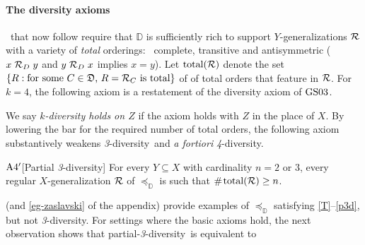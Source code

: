 \documentclass[12pt,a4paper,twoside]{article}
\newcommand{\gsii}{$\textup{GS03}$}
\newcommand{\reg}{\operatorname{reg}}
\newcommand{\preceqb}{\mathbin{\preceq}}
\newcommand{\countof}{\mathbin{\#}\hskip1pt}
\newcommand{\ext}{\mathrel{\mc R}}
\newcommand{\extb}{\mathbin{\mc R}}
\newcommand{\total}{\textup{total}}
\newcommand{\mbbd}{{\mathds D}}
\newcommand{\dpp}{{\mathfrak D}}
\newcommand{\mbbc}{{\mathds C}}
\newcommand{\lb}{\left\{}
\newcommand{\rb}{\right\}}
\newcommand{\parthreediv}{\textup{partial-\textit{3}-diversity}}
\newcommand{\fourdiv}{\textit{4}-\textup{diversity}}
\newcommand{\threediv}{\textit{3}-\textup{diversity}}
\begin{document}




\paragraph{The diversity axioms\hskip-10pt}~that now follow require that $\mbbd$
is sufficiently rich to support $Y$-{generalization}s $\ext$ with a variety of
\emph{total} orderings: \ie\ complete, transitive and antisymmetric
($x \ext_{D} y$ and $y \ext_{D} x$ implies $x = y$). %
Let $\total ( \ext )$ denote the set $\lb R : \text{for some
 $ C \in \dpp $, $ R = \extb _{C}$ is total}\rb$ of of total orders that
feature in $\ext$. For $k = 4$, the following axiom is a restatement of the
diversity axiom of \gsii.
 
We say \emph{$k$-diversity holds on $Z$} if the axiom holds with $Z$ in the
place of $X$. By lowering the bar for the required number of total orders, the
following axiom substantively weakens \threediv\ and \emph{a fortiori} \fourdiv.

\begin{taggedblank}{$\textup{A}4'$}[Partial \threediv]\label{p3d}
  For every $Y\subseteq X$ with cardinality $n = 2$ or $3$, every regular
  $X$-{generalization} $\ext$ of $\preceq _{\mbbd}$ is such that $\countof
  \total ( \ext ) \geq n$.

\end{taggedblank}



 (and \cref{eg-zaslavski} of the appendix) provide examples of
$\preceq_{\mbbd}$ satisfying \ref{T}–\ref{p3d}, but not \threediv.  For
settings where the basic axioms hold, the next observation shows that
\parthreediv\ is equivalent to
\end{document}

